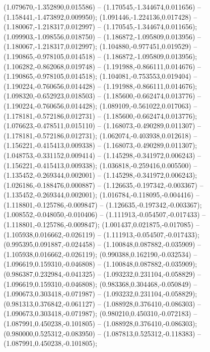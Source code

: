  (1.079670,-1.352890,0.015586) -- (1.170545,-1.344674,0.011656) -- (1.158441,-1.473892,0.009950);
 (1.091446,-1.224136,0.017428) -- (1.180067,-1.218317,0.012997) -- (1.170545,-1.344674,0.011656);
 (1.099903,-1.098556,0.018750) -- (1.186872,-1.095809,0.013956) -- (1.180067,-1.218317,0.012997);
 (1.104880,-0.977451,0.019529) -- (1.190865,-0.978105,0.014518) -- (1.186872,-1.095809,0.013956);
 (1.106282,-0.862068,0.019748) -- (1.191988,-0.866111,0.014676) -- (1.190865,-0.978105,0.014518);
 (1.104081,-0.753553,0.019404) -- (1.190224,-0.760656,0.014428) -- (1.191988,-0.866111,0.014676);
 (1.098320,-0.652923,0.018503) -- (1.185600,-0.662474,0.013776) -- (1.190224,-0.760656,0.014428);
 (1.089109,-0.561022,0.017063) -- (1.178181,-0.572186,0.012731) -- (1.185600,-0.662474,0.013776);
 (1.076623,-0.478511,0.015110) -- (1.168073,-0.490289,0.011307) -- (1.178181,-0.572186,0.012731);
 (1.062074,-0.403938,0.012618) -- (1.156221,-0.415413,0.009338) -- (1.168073,-0.490289,0.011307);
 (1.048753,-0.331152,0.009414) -- (1.145298,-0.341972,0.006243) -- (1.156221,-0.415413,0.009338);
 (1.036818,-0.259416,0.005500) -- (1.135452,-0.269344,0.002001) -- (1.145298,-0.341972,0.006243);
 (1.026186,-0.188476,0.000887) -- (1.126635,-0.197342,-0.003367) -- (1.135452,-0.269344,0.002001);
 (1.016784,-0.118095,-0.004416) -- (1.118801,-0.125786,-0.009847) -- (1.126635,-0.197342,-0.003367);
 (1.008552,-0.048050,-0.010406) -- (1.111913,-0.054507,-0.017433) -- (1.118801,-0.125786,-0.009847);
 (1.001437,0.021875,-0.017085) -- (1.105938,0.016662,-0.026119) -- (1.111913,-0.054507,-0.017433);
 (0.995395,0.091887,-0.024458) -- (1.100848,0.087882,-0.035909) -- (1.105938,0.016662,-0.026119);
 (0.990388,0.162190,-0.032534) -- (1.096619,0.159310,-0.046808) -- (1.100848,0.087882,-0.035909);
 (0.986387,0.232984,-0.041325) -- (1.093232,0.231104,-0.058829) -- (1.096619,0.159310,-0.046808);
 (0.983368,0.304468,-0.050849) -- (1.090673,0.303418,-0.071987) -- (1.093232,0.231104,-0.058829);
 (0.981313,0.376842,-0.061127) -- (1.088928,0.376410,-0.086303) -- (1.090673,0.303418,-0.071987);
 (0.980210,0.450310,-0.072183) -- (1.087991,0.450238,-0.101805) -- (1.088928,0.376410,-0.086303);
 (0.980000,0.525312,-0.083950) -- (1.087813,0.525312,-0.118383) -- (1.087991,0.450238,-0.101805);
